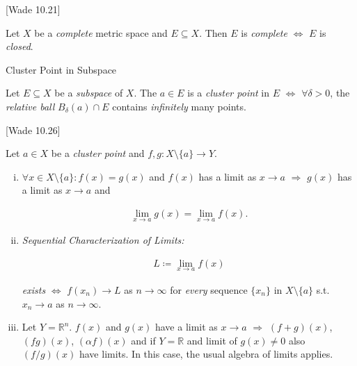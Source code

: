 \documentclass[10pt]{article} %
\newcommand{\cw}[1]{[Wade #1]}
\begin{document}
\begin{multicols}{3}
\begin{theorem}{\cw{10.21}}{}

    Let $X$ be a \emph{complete} metric space and $E \subseteq X$. Then $E$ is \emph{complete} $\Leftrightarrow$ $E$ is \emph{closed}.

\end{theorem}

\begin{remark}{}{Cluster Point in Subspace}

    Let $E \subseteq X$ be a \emph{subspace} of $X$. The $a \in E$ is a \emph{cluster point} in $E$ $\Leftrightarrow$ $\forall \delta > 0$, the \emph{relative ball} $B_{\delta}(a) \cap E$ contains \emph{infinitely} many points.

\end{remark}

\begin{theorem}{\cw{10.26}}{}

    Let $a \in X$ be a \emph{cluster point} and $f,g : X \setminus \{a\} \to Y$.

        \begin{enumerate}[i)]
            \setlength{\parskip}{0em}
            \item $\forall x \in X \setminus \{a\}: f(x) = g(x)$ and $f(x)$ has a limit as $x \to a$ $\Rightarrow$ $g(x)$ has a limit as $x \to a$ and

                \begin{align*}
                    \lim_{x \to a} g(x) = \lim_{x \to a} f(x).
                \end{align*}

            \item \emph{Sequential Characterization of Limits:}

                \begin{align*}
                    L \coloneqq \lim_{x \to a} f(x)
                \end{align*}

            \emph{exists} $\Leftrightarrow$ $f(x_n) \to L$ as $n \to \infty$ for \emph{every} sequence $\{x_n\}$ in $X \setminus \{a\}$ s.t. $x_n \to a$ as $n \to \infty$.

            \item Let $Y = \mathbb{R}^n$. $f(x)$ and $g(x)$ have a limit as $x \to a$ $\Rightarrow$ $(f+g)(x)$, $(fg)(x)$, $(\alpha f)(x)$ and if $Y = \mathbb{R}$ and limit of $g(x) \neq 0$ also $(f/g)(x)$ have limits. In this case, the usual algebra of limits applies.


\end{enumerate}
\end{theorem}
\end{multicols}
\end{document}
